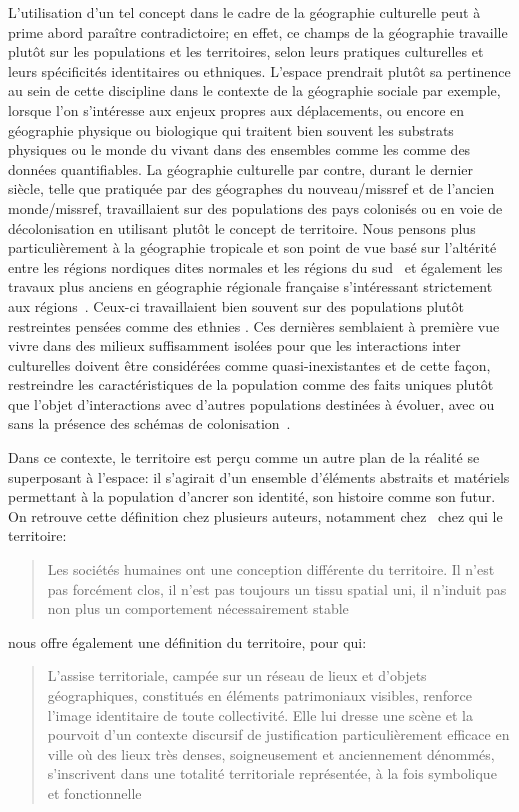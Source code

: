 L'utilisation d'un tel concept dans le cadre de la géographie culturelle peut à prime abord paraître contradictoire; en effet, ce champs de la géographie travaille plutôt sur les populations et les territoires, selon leurs pratiques culturelles et leurs spécificités identitaires ou ethniques. 
L'espace prendrait plutôt sa pertinence au sein de cette discipline dans le contexte de la géographie sociale par exemple, lorsque l'on s'intéresse aux enjeux propres aux déplacements, ou encore en géographie physique ou biologique qui traitent bien souvent les substrats physiques ou le monde du vivant dans des ensembles comme les  comme des données quantifiables. 
La géographie culturelle par contre, durant le dernier siècle, telle que pratiquée par des géographes du nouveau/missref et de l'ancien monde/missref, travaillaient sur des populations des pays colonisés ou en voie de décolonisation en utilisant plutôt le concept de territoire. 
Nous pensons plus particulièrement à la géographie tropicale et son point de vue basé sur l'altérité entre les régions nordiques dites normales et les régions du sud~\citep[493]{Power2009} et également les travaux plus anciens en géographie régionale française s'intéressant strictement aux régions~\citep[31]{Courville1991}. 
Ceux-ci travaillaient bien souvent sur des populations plutôt restreintes pensées comme des ethnies .
Ces dernières semblaient à première vue vivre dans des milieux suffisamment isolées pour que les interactions inter culturelles doivent être considérées comme quasi-inexistantes et de cette façon, restreindre les caractéristiques de la population comme des faits uniques plutôt que l'objet d'interactions avec d'autres populations destinées à évoluer, avec ou sans la présence des schémas de colonisation~\citep[79--80]{DiMeo2007}.

Dans ce contexte, le territoire est perçu comme un autre plan de la réalité se superposant à l'espace: il s'agirait d'un ensemble d'éléments abstraits et matériels permettant à la population d'ancrer son identité, son histoire comme son futur. 
On retrouve cette définition chez plusieurs auteurs, notamment chez~\citeauthor{Bonnemaison1981} chez qui le territoire:
\blockquote[{\cite[253]{Bonnemaison1981}}][.]{Les sociétés humaines ont une
  conception différente du territoire. Il n'est pas forcément clos, il n'est pas
  toujours un tissu spatial uni, il n'induit pas non plus un comportement
  nécessairement stable}. 
\citeauthor{DiMeo2007} nous offre également une définition du territoire, pour qui:
\blockquote[{\cite[76]{DiMeo2007}}][.]{L’assise territoriale, campée sur un
  réseau de lieux et d’objets géographiques, constitués en éléments patrimoniaux
  visibles, renforce l’image identitaire de toute collectivité. Elle lui dresse
  une scène et la pourvoit d’un contexte discursif de justification
  particulièrement efficace en ville où des lieux très denses, soigneusement et
  anciennement dénommés, s’inscrivent dans une totalité territoriale
  représentée, à la fois symbolique et fonctionnelle}. 

